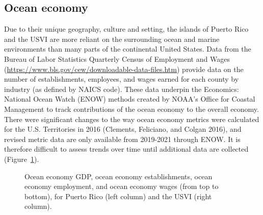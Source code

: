 \documentclass[
  letterpaper,
  oneside,
  open=any]{scrbook}
\begin{document}
\subsection{Ocean economy}\label{ocean-economy}

Due to their unique geography, culture and setting, the islands of
Puerto Rico and the USVI are more reliant on the surrounding ocean and
marine environments than many parts of the continental United States.
Data from the Bureau of Labor Statistics Quarterly Census of Employment
and Wages (\url{https://www.bls.gov/cew/downloadable-data-files.htm})
provide data on the number of establishments, employees, and wages
earned for each county by industry (as defined by NAICS code). These
data underpin the Economics: National Ocean Watch (ENOW) methods created
by NOAA's Office for Coastal Management to track contributions of the
ocean economy to the overall economy. There were significant changes to
the way ocean economy metrics were calculated for the U.S. Territories
in 2016 (Clements, Feliciano, and Colgan 2016), and revised metric data
are only available from 2019-2021 through ENOW. It is therefore
difficult to assess trends over time until additional data are collected
(Figure~\ref{fig-NAICS}).

\begin{figure}


\caption{\label{fig-NAICS}Ocean economy GDP, ocean economy
establishments, ocean economy employment, and ocean economy wages (from
top to bottom), for Puerto Rico (left column) and the USVI (right
column).}

\end{figure}%
\end{document}
